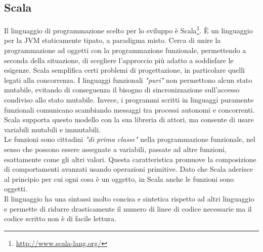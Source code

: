 \subsection*{Scala}
Il linguaggio di programmazione scelto per lo sviluppo è Scala\footnote{\url{http://www.scala-lang.org/}}. È un linguaggio per la \gls{JVM} staticamente tipato, a paradigma misto. Cerca di unire la programmazione ad oggetti con la programmazione funzionale, permettendo a seconda della situazione, di scegliere l'approccio più adatto a soddisfare le esigenze.  Scala semplifica certi problemi di progettazione, in particolare quelli legati alla concorrenza. I linguaggi funzionali \textit{"puri"} non permettono alcun stato mutabile, evitando di conseguenza il bisogno di sincronizzazione sull'accesso condiviso allo stato mutabile. Invece, i programmi scritti in linguaggi puramente funzionali comunicano scambiando messaggi tra processi autonomi e concorrenti. Scala supporta questo modello con la sua libreria di attori, ma consente di usare variabili mutabili e immutabili.\\
Le funzioni sono cittadini \textit{"di prima classe"} nella programmazione funzionale, nel senso che possono essere assegnate a variabili, passate ad altre funzioni, esattamente come gli altri valori. Questa caratteristica promuove la composizione di comportamenti avanzati usando operazioni primitive. Dato che Scala aderisce al principio per cui ogni cosa è un oggetto, in Scala anche le funzioni sono oggetti.\\ Il linguaggio ha una sintassi molto concisa e sintetica rispetto ad altri linguaggio e permette di ridurre drasticamente il numero di linee di codice necessarie ma il codice scritto non è di facile lettura.

